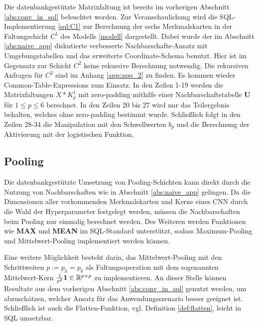 

Die datenbankgestützte Matrixfaltung ist bereits im vorherigen Abschnitt \ref{abs:conv_in_sql} beleuchtet worden. Zur Veranschaulichung wird die SQL-Implementierung \ref{sql:C1} zur Berechnung der sechs Merkmalskarten in der Faltungschicht $C^1$ des Modells \ref{modell} dargestellt. Dabei wurde der im Abschnitt \ref{abs:naive_app} diskutierte verbesserte Nachbarschafts-Ansatz mit Umgebungstabellen und das erweiterte Coordinate-Schema benutzt. Hier ist im Gegensatz zur Schicht $C^2$ keine rekursive Berechnung notwendig. Die rekursiven Anfragen für $C^2$ sind im Anhang \ref{app:app_2} zu finden. Es kommen wieder Common-Table-Expressions zum Einsatz. In den Zeilen 1-19 werden die Matrixfaltungen $X \ast K^{1}_p$ mit zero-padding mithilfe einer Nachbarschaftstabelle \textbf{U} für $1 \leq p \leq 6$ berechnet. In den Zeilen 20 bis 27 wird nur das Teilergebnis behalten, welches ohne zero-padding bestimmt wurde. Schließlich folgt in den Zeilen 28-34 die Manipulation mit den Schwellwerten $b_p$ und die Berechnung der Aktivierung mit der logistischen Funktion.



\subsection*{Pooling}
Die datenbankgestützte Umsetzung von Pooling-Schichten kann direkt durch die Nutzung von Nachbarschaften wie in Abschnitt \ref{abs:naive_app} gelingen. Da die Dimensionen aller vorkommenden Merkmalskarten und Kerne eines CNN durch die Wahl der Hyperparameter festgelegt werden, müssen die Nachbarschaften beim Pooling nur einmalig berechnet werden. Des Weiteren werden Funktionen wie \textbf{MAX} und \textbf{MEAN} im SQL-Standard unterstützt, sodass Maximum-Pooling und Mittelwert-Pooling implementiert werden können.

Eine weitere Möglichkeit besteht darin, das Mittelwert-Pooling mit den Schrittweiten $p:=p_h=p_b$ als Faltungsoperation mit dem sogenannten Mittelwert-Kern $\frac{1}{p^2} \mathbf{1} \in \mathbb{R}^{p \times p}$ zu implementieren. An dieser Stelle können Resultate aus dem vorherigen Abschnitt \ref{abs:conv_in_sql} genutzt werden, um abzuschätzen, welcher Ansatz für das Anwendungsszenario besser geeignet ist. Schließlich ist auch die Flatten-Funktion, vgl. Definition \ref{def:flatten}, leicht in SQL umsetzbar. 

